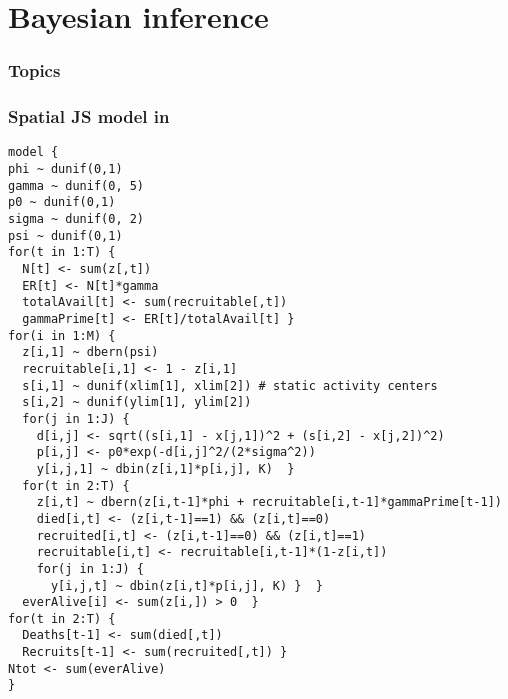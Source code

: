 \documentclass[color=usenames,dvipsnames]{beamer}\usepackage[]{graphicx}\usepackage[]{color}
\makeatletter
\newenvironment{kframe}{%
 \def\at@end@of@kframe{}%
 \ifinner\ifhmode%
  \def\at@end@of@kframe{\end{minipage}}%
  \begin{minipage}{\columnwidth}%
 \fi\fi%
 \def\FrameCommand##1{\hskip\@totalleftmargin \hskip-\fboxsep
 \colorbox{shadecolor}{##1}\hskip-\fboxsep
     \hskip-\linewidth \hskip-\@totalleftmargin \hskip\columnwidth}%
 \MakeFramed {\advance\hsize-\width
   \@totalleftmargin\z@ \linewidth\hsize
   \@setminipage}}%
 {\par\unskip\endMakeFramed%
 \at@end@of@kframe}
\newenvironment{knitrout}{}{} %
\makeatother
\begin{document}
\section{Bayesian inference}




\begin{frame}[plain]
  \frametitle{Topics}
  \Large
  \tableofcontents[currentsection]
\end{frame}



\begin{frame}[fragile]
  \frametitle{Spatial JS model in \jags}
  \tiny
\begin{knitrout}\tiny
{}\color{fgcolor}\begin{kframe}
\begin{verbatim}
model {
phi ~ dunif(0,1)
gamma ~ dunif(0, 5)
p0 ~ dunif(0,1)
sigma ~ dunif(0, 2)
psi ~ dunif(0,1)
for(t in 1:T) {
  N[t] <- sum(z[,t])
  ER[t] <- N[t]*gamma
  totalAvail[t] <- sum(recruitable[,t])
  gammaPrime[t] <- ER[t]/totalAvail[t] }
for(i in 1:M) {
  z[i,1] ~ dbern(psi)
  recruitable[i,1] <- 1 - z[i,1]
  s[i,1] ~ dunif(xlim[1], xlim[2]) # static activity centers
  s[i,2] ~ dunif(ylim[1], ylim[2])
  for(j in 1:J) {
    d[i,j] <- sqrt((s[i,1] - x[j,1])^2 + (s[i,2] - x[j,2])^2)
    p[i,j] <- p0*exp(-d[i,j]^2/(2*sigma^2))
    y[i,j,1] ~ dbin(z[i,1]*p[i,j], K)  }
  for(t in 2:T) {
    z[i,t] ~ dbern(z[i,t-1]*phi + recruitable[i,t-1]*gammaPrime[t-1])
    died[i,t] <- (z[i,t-1]==1) && (z[i,t]==0)
    recruited[i,t] <- (z[i,t-1]==0) && (z[i,t]==1)
    recruitable[i,t] <- recruitable[i,t-1]*(1-z[i,t])
    for(j in 1:J) {
      y[i,j,t] ~ dbin(z[i,t]*p[i,j], K) }  }
  everAlive[i] <- sum(z[i,]) > 0  }
for(t in 2:T) {
  Deaths[t-1] <- sum(died[,t])
  Recruits[t-1] <- sum(recruited[,t]) }
Ntot <- sum(everAlive)
}
\end{verbatim}
\end{kframe}
\end{knitrout}
\end{frame}
\end{document}
